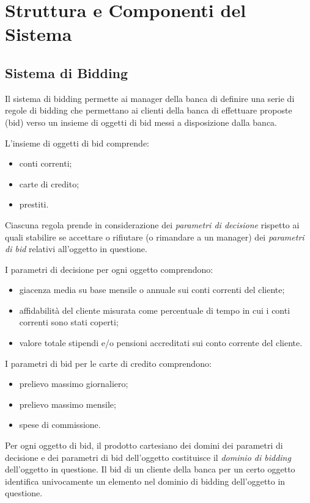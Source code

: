 
\section{Struttura e Componenti del Sistema}

\subsection{Sistema di Bidding}

Il sistema di bidding permette ai manager della banca di definire una serie di regole di bidding che permettano ai clienti della banca di effettuare proposte (bid) verso un insieme di oggetti di bid messi a disposizione dalla banca.

L'insieme di oggetti di bid comprende:
\begin{itemize}
	\item conti correnti;
	\item carte di credito;
	\item prestiti.
\end{itemize}

Ciascuna regola prende in considerazione dei \emph{parametri di decisione} rispetto ai quali stabilire se accettare o rifiutare (o rimandare a un manager) dei \emph{parametri di bid} relativi all'oggetto in questione.

I parametri di decisione per ogni oggetto comprendono:
\begin{itemize}
	\item giacenza media su base mensile o annuale sui conti correnti del cliente;

	\item affidabilità del cliente misurata come percentuale di tempo in cui i conti correnti sono stati coperti;

	\item valore totale stipendi e/o pensioni accreditati sui conto corrente del cliente.
\end{itemize}

I parametri di bid per le carte di credito comprendono:
\begin{itemize}
	\item prelievo massimo giornaliero;

	\item prelievo massimo mensile;

	\item spese di commissione.
\end{itemize}

Per ogni oggetto di bid, il prodotto cartesiano dei domini dei parametri di decisione e dei parametri di bid dell'oggetto costituisce il \emph{dominio di bidding} dell'oggetto in questione.
Il bid di un cliente della banca per un certo oggetto identifica univocamente un elemento nel dominio di bidding dell'oggetto in questione.

